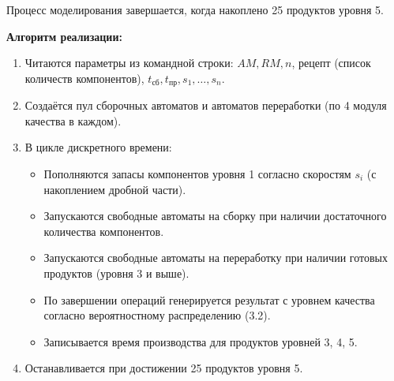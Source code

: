 \documentclass[a4paper]{article}
\theoremstyle{definition}
\begin{document}
Процесс моделирования завершается, когда накоплено 25 продуктов уровня 5.

\textbf{Алгоритм реализации:}

\begin{enumerate}
    \item Читаются параметры из командной строки: $AM, RM, n$, рецепт (список количеств компонентов), $t_{\text{сб}}, t_{\text{пр}}, s_1, \dots, s_n$.
    \item Создаётся пул сборочных автоматов и автоматов переработки (по 4 модуля качества в каждом).
    \item В цикле дискретного времени:
        \begin{itemize}
            \item Пополняются запасы компонентов уровня 1 согласно скоростям $s_i$ (с накоплением дробной части).
            \item Запускаются свободные автоматы на сборку при наличии достаточного количества компонентов.
            \item Запускаются свободные автоматы на переработку при наличии готовых продуктов (уровня 3 и выше).
            \item По завершении операций генерируется результат с уровнем качества согласно вероятностному распределению (3.2).
            \item Записывается время производства для продуктов уровней 3, 4, 5.
        \end{itemize}
    \item Останавливается при достижении 25 продуктов уровня 5.
\end{enumerate}
\end{document}
